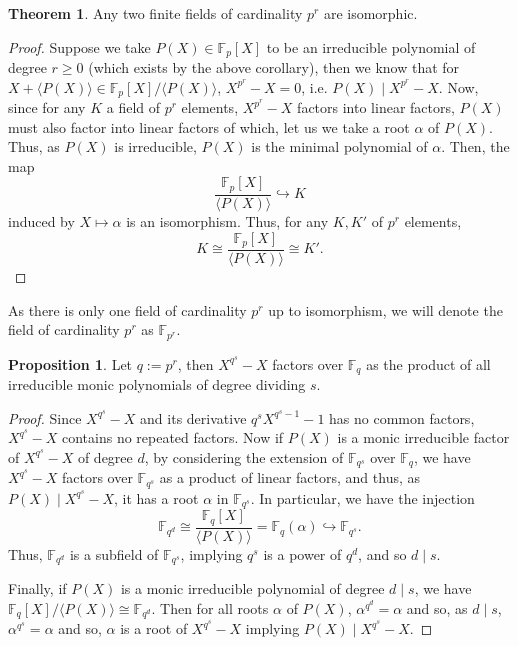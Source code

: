 \documentclass[]{article}
\theoremstyle{definition}
\newtheorem{theorem}{Theorem}
\theoremstyle{definition}
\newtheorem{proposition}{Proposition}[section]
\begin{document}
\begin{theorem}
  Any two finite fields of cardinality \(p^r\) are isomorphic.
\end{theorem}
\begin{proof}
  Suppose we take \(P(X) \in \mathbb{F}_p[X]\) to be an irreducible polynomial of 
  degree \(r \ge 0\) (which exists by the above corollary), then we know that 
  for \(X + \langle P(X) \rangle \in \mathbb{F}_p[X] / \langle P(X) \rangle\), 
  \(X^{p^r} - X = 0\), i.e. \(P(X) \mid X^{p^r} - X\). Now, since for any \(K\) a 
  field of \(p^r\) elements, \(X^{p^r} - X\) factors into linear factors, 
  \(P(X)\) must also factor into linear factors of which, let us we take a 
  root \(\alpha\) of \(P(X)\). Thus, as \(P(X)\) is irreducible, \(P(X)\) is 
  the minimal polynomial of \(\alpha\). Then, the map 
  \[\frac{\mathbb{F}_p[X]}{\langle P(X) \rangle} \hookrightarrow K\]
  induced by \(X \mapsto \alpha\) is an isomorphism. Thus, for any 
  \(K, K'\) of \(p^r\) elements, 
  \[K \cong \frac{\mathbb{F}_p[X]}{\langle P(X) \rangle} \cong K'.\]
\end{proof}

As there is only one field of cardinality \(p^r\) up to isomorphism, we will 
denote the field of cardinality \(p^r\) as \(\mathbb{F}_{p^r}\).

\begin{proposition}
  Let \(q := p^r\), then \(X^{q^s} - X\) factors over \(\mathbb{F}_q\) as the 
  product of all irreducible monic polynomials of degree dividing \(s\).
\end{proposition}
\begin{proof}
  Since \(X^{q^s} - X\) and its derivative \(q^s X^{q^s - 1} - 1\) has no common 
  factors, \(X^{q^s} - X\) contains no repeated factors. Now if \(P(X)\) is a
  monic irreducible factor of \(X^{q^s} - X\) of degree \(d\), by considering 
  the extension of \(\mathbb{F}_{q^s}\) over \(\mathbb{F}_q\), we have 
  \(X^{q^s} - X\) factors over \(\mathbb{F}_{q^s}\) as a product of linear 
  factors, and thus, as \(P(X) \mid X^{q^s} - X\), it has a root \(\alpha\) 
  in \(\mathbb{F}_{q^s}\). In particular, we have the injection 
  \[\mathbb{F}_{q^d} \cong \frac{\mathbb{F}_q[X]}{\langle P(X) \rangle} 
    = \mathbb{F}_q(\alpha) \hookrightarrow \mathbb{F}_{q^s}.\]
  Thus, \(\mathbb{F}_{q^d}\) is a subfield of \(\mathbb{F}_{q^s}\), implying 
  \(q^s\) is a power of \(q^d\), and so \(d \mid s\).

  Finally, if \(P(X)\) is a monic irreducible polynomial of degree \(d \mid s\), 
  we have \(\mathbb{F}_q[X] / \langle P(X) \rangle \cong \mathbb{F}_{q^d}\). Then 
  for all roots \(\alpha\) of \(P(X)\), \(\alpha^{q^d} = \alpha\) and so, 
  as \(d \mid s\), \(\alpha^{q^s} = \alpha\) and so, \(\alpha\) is a root of 
  \(X^{q^s} - X\) implying \(P(X) \mid X^{q^s} - X\).
\end{proof}
\end{document}

